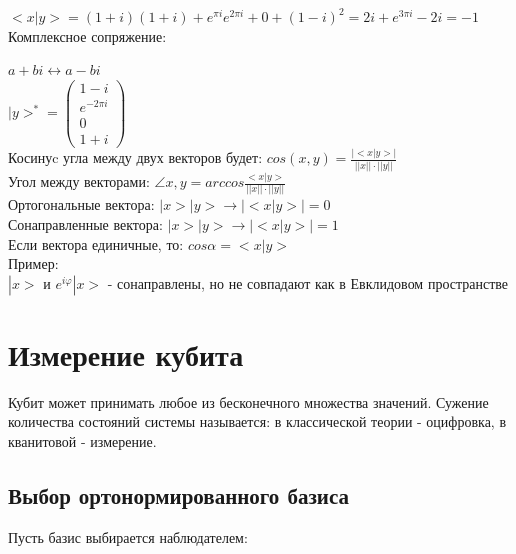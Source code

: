 \documentclass[11pt]{report}
\begin{document}
$<x|y>=(1+i)(1+i)+e^{\pi i}e^{2\pi i} + 0 +(1-i)^2 = 2i +e^{3\pi i} - 2i = -1
$\\

Комплексное сопряжение:

$a+bi \leftrightarrow a-bi$\\

$|y>^{\text{*}} = \begin{pmatrix}
1-i \\
e^{-2\pi i} \\
0 \\
1+i
\end{pmatrix}$\\

Косинуc угла между двух векторов будет: $cos(x,y) = \frac{|<x|y>|}{||x|| \cdot ||y||}$ \\

Угол между векторами: $\angle x,y = arccos \frac{<x|y>}{||x|| \cdot ||y||}$\\

Ортогональные вектора: $|x>|y> \rightarrow |<x|y>| = 0$\\

Сонаправленные вектора: $|x>|y> \rightarrow |<x|y>| = 1$\\

Если вектора единичные, то: $cos\alpha = <x|y>$\\

Пример:\\
$|x> \text{ и } e^{i\varphi}|x>$ - сонаправлены, но не совпадают как в Евклидовом пространстве

\section{Измерение кубита}
Кубит может принимать любое из бесконечного множества значений. Сужение количества состояний системы называется: в классической теории - оцифровка, в кванитовой - измерение.
\subsection{Выбор ортонормированного базиса}
Пусть базис выбирается наблюдателем:\\
\end{document}
